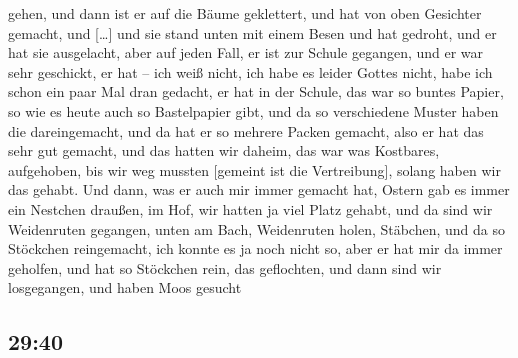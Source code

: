 \documentclass[ngerman,]{article}
\begin{document}
\begin{multicols}{2}
\begin{description}
gehen, und dann ist er auf die Bäume geklettert, und hat von oben
Gesichter gemacht, und {[}\ldots{}{]} und sie stand unten mit einem
Besen und hat gedroht, und er hat sie ausgelacht, aber auf jeden Fall,
er ist zur Schule gegangen, und er war sehr geschickt, er hat – ich weiß
nicht, ich habe es leider Gottes nicht, habe ich schon ein paar Mal dran
gedacht, er hat in der Schule, das war so buntes Papier, so wie es heute
auch so Bastelpapier gibt, und da so verschiedene Muster haben die
dareingemacht, und da hat er so mehrere Packen gemacht, also er hat das
sehr gut gemacht, und das hatten wir daheim, das war was Kostbares,
aufgehoben, bis wir weg mussten {[}gemeint ist die Vertreibung{]},
solang haben wir das gehabt. Und dann, was er auch mir immer gemacht
hat, Ostern gab es immer ein Nestchen draußen, im Hof, wir hatten ja
viel Platz gehabt, und da sind wir Weidenruten gegangen, unten am Bach,
Weidenruten holen, Stäbchen, und da so Stöckchen reingemacht, ich konnte
es ja noch nicht so, aber er hat mir da immer geholfen, und hat so
Stöckchen rein, das geflochten, und dann sind wir losgegangen, und haben
Moos gesucht
\end{description}

\hypertarget{section-1}{%
\subsection{29:40}\label{section-1}}


\end{multicols}
\end{document}
